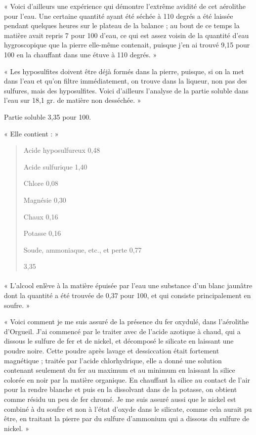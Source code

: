 \documentclass[a4paper, 11pt, oneside, polutonikogreek, french]{article}
\begin{document}
« Voici d'ailleurs une expérience qui démontre l'extrême avidité de cet aérolithe pour l'eau. Une certaine quantité ayant été séchée à 110 degrés a été laissée pendant quelques heures sur le plateau de la balance ; au bout de ce temps la matière avait repris 7 pour 100 d'eau, ce qui est assez voisin de la quantité d'eau hygroscopique que la pierre elle-même contenait, puisque j'en ai trouvé 9,15 pour 100 en la chauffant dans une étuve à 110 degrés. »

« Les hyposulfites doivent être déjà formés dans la pierre, puisque, si on la met dans l'eau et qu'on filtre immédiatement, on trouve dans la liqueur, non pas des sulfures, mais des hyposulfites. Voici d'ailleurs l'analyse de la partie soluble dans l'eau sur 18,1 gr. de matière non desséchée. »

Partie soluble 3,35 pour 100.

« Elle contient : »
\begin{quotation}
Acide hyposulfureux 0,48

Acide sulfurique 1,40

Chlore 0,08

Magnésie 0,30

Chaux 0,16

Potasse 0,16

Soude, ammoniaque, etc., et perte 0,77

3,35
\end{quotation}
\paragraph{}
« L'alcool enlève à la matière épuisée par l'eau une substance d'un blanc jaunâtre dont la quantité a été trouvée de 0,37 pour 100, et qui consiste principalement en soufre. »

« Voici comment je me suis assuré de la présence du fer oxydulé, dans l'aérolithe d'Orgueil. J'ai commencé par le traiter avec de l'acide azotique à chaud, qui a dissous le sulfure de fer et de nickel, et décomposé le silicate en laissant une poudre noire. Cette poudre après lavage et dessiccation était fortement magnétique ; traitée par l'acide chlorhydrique, elle a donné une solution contenant seulement du fer au maximum et au minimum en laissant la silice colorée en noir par la matière organique. En chauffant la silice au contact de l'air pour la rendre blanche et puis en la dissolvant dans de la potasse, on obtient comme résidu un peu de fer chromé. Je me suis assuré aussi que le nickel est combiné à du soufre et non à l'état d'oxyde dans le silicate, comme cela aurait pu être, en traitant la pierre par du sulfure d'ammonium qui a dissous du sulfure de nickel. »
\end{document}
